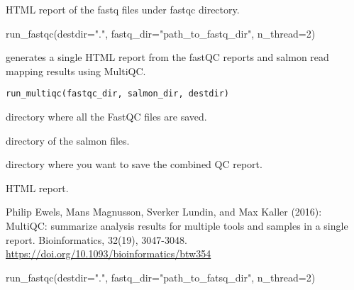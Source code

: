 \documentclass[letterpaper]{book}
\begin{document}
%
\begin{Value}
HTML report of the fastq files under fastqc directory.
\end{Value}
%
\begin{Examples}
\begin{ExampleCode}

run_fastqc(destdir=".", fastq_dir="path_to_fastq_dir", n_thread=2)

\end{ExampleCode}
\end{Examples}
%
\begin{Description}\relax
{} generates a single HTML report from the fastQC reports and salmon read mapping results using MultiQC.
\end{Description}
%
\begin{Usage}
\begin{verbatim}
run_multiqc(fastqc_dir, salmon_dir, destdir)
\end{verbatim}
\end{Usage}
%
\begin{Arguments}
\begin{ldescription}
\item[\code{fastqc\_dir}] directory where all the FastQC files are saved.

\item[\code{salmon\_dir}] directory of the salmon files.

\item[\code{destdir}] directory where you want to save the combined QC report.
\end{ldescription}
\end{Arguments}
%
\begin{Value}
HTML report.
\end{Value}
%
\begin{References}\relax
Philip Ewels, Mans Magnusson, Sverker Lundin, and Max Kaller (2016):
MultiQC: summarize analysis results for multiple tools and samples 
in a single report. Bioinformatics, 32(19), 3047-3048.
\url{https://doi.org/10.1093/bioinformatics/btw354}
\end{References}
%
\begin{Examples}
\begin{ExampleCode}

run_fastqc(destdir=".", fastq_dir="path_to_fatsq_dir", n_thread=2)

\end{ExampleCode}
\end{Examples}
\end{document}
